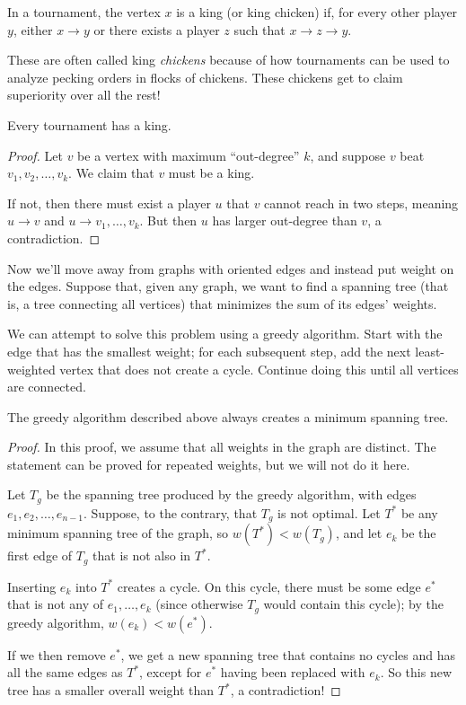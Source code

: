 \documentclass[../m055main.tex]{subfiles}
\begin{document}
\begin{definition}
    In a tournament, the vertex $x$ is a king (or king chicken) if, for every other player $y$, either $x \to y$ or there exists a player $z$ such that $x \to z \to y$.
\end{definition}

These are often called king \textit{chickens} because of how tournaments can be used to analyze pecking orders in flocks of chickens.
These chickens get to claim superiority over all the rest!

\begin{theorem}
    Every tournament has a king.
\end{theorem}

\begin{proof}
    Let $v$ be a vertex with maximum ``out-degree'' $k$, and suppose $v$ beat $v_1, v_2, \ldots, v_k$.
    We claim that $v$ must be a king.

    If not, then there must exist a player $u$ that $v$ cannot reach in two steps, meaning $u \to v$ and $u \to v_1, \ldots, v_k$.
    But then $u$ has larger out-degree than $v$, a contradiction.
\end{proof}

Now we'll move away from graphs with oriented edges and instead put weight on the edges.
Suppose that, given any graph, we want to find a spanning tree (that is, a tree connecting all vertices) that minimizes the sum of its edges' weights.

We can attempt to solve this problem using a greedy algorithm.
Start with the edge that has the smallest weight; for each subsequent step, add the next least-weighted vertex that does not create a cycle.
Continue doing this until all vertices are connected.

\begin{theorem}[]
    The greedy algorithm described above always creates a minimum spanning tree.
\end{theorem}

\begin{proof}
    In this proof, we assume that all weights in the graph are distinct.
    The statement can be proved for repeated weights, but we will not do it here.

    Let $T_g$ be the spanning tree produced by the greedy algorithm, with edges $e_1, e_2, \ldots, e_{n-1}$.
    Suppose, to the contrary, that $T_g$ is not optimal.
    Let $T^*$ be any minimum spanning tree of the graph, so $w(T^*) < w(T_g)$, and let $e_k$ be the first edge of $T_g$ that is not also in $T^*$.

    Inserting $e_k$ into $T^*$ creates a cycle.
    On this cycle, there must be some edge $e^*$ that is not any of $e_1, \ldots, e_k$ (since otherwise $T_g$ would contain this cycle); by the greedy algorithm, $w(e_k) < w(e^*)$.

    If we then remove $e^*$, we get a new spanning tree that contains no cycles and has all the same edges as $T^*$, except for $e^*$ having been replaced with $e_k$.
    So this new tree has a smaller overall weight than $T^*$, a contradiction!
\end{proof}
\end{document}
